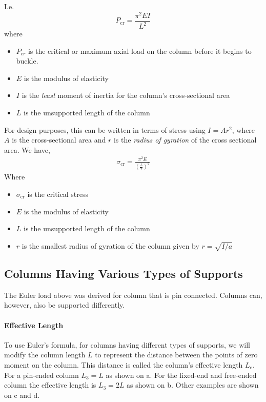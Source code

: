 I.e.
\begin{equation*}
  P_{\mathrm{cr}} = \frac{\pi^2 EI}{L^2}
\end{equation*}
where
\begin{itemize}
  \item $P_{cr}$ is the critical or maximum axial load on the column before it begins to buckle.
  \item $E$ is the modulus of elasticity
  \item $I$ is the \textit{least} moment of inertia for the column's cross-sectional area
  \item $L$ is the unsupported length of the column
\end{itemize}

For design purposes, this can be written in terms of stress using $I = A r^2$, where $A$ is the cross-sectional area and $r$ is the \textit{radius of gyration} of the cross sectional area.
We have,
\begin{align*}
  \sigma_{\mathrm{cr}} = \frac{\pi^2 E}{\left( \frac{L}{r} \right)^2}
\end{align*}
Where
\begin{itemize}
  \item $\sigma_{\mathrm{cr}}$ is the critical stress
  \item $E$ is the modulus of elasticity
  \item $L$ is the unsupported length of the column
  \item $r$ is the smallest radius of gyration of the column given by $r = \sqrt{I / a}$
\end{itemize}


\subsection{Columns Having Various Types of Supports}
The Euler load above was derived for column that is pin connected.
Columns can, however, also be supported differently.

\paragraph{Effective Length}
To use Euler's formula, for columns having different types of supports, we will modify the column length $L$ to represent the distance between the points of zero moment on the column.
This distance is called the column's effective length $L_e$.
For a pin-ended column $L_3 = L$ as shown on a.
For the fixed-end and free-ended column the effective length is $L_3 = 2L$ as shown on b.
Other examples are shown on c and d.

